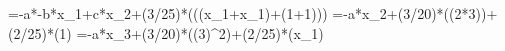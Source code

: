 =-a*-b*x_1+c*x_2+(3/25)*\sin(((x_1+x_1)+(1+1)))
=-a*x_2+(3/20)*\sin((2*3))+(2/25)*\cos(1)
=-a*x_3+(3/20)*\sin((3)^2)+(2/25)*\cos(x_1)
